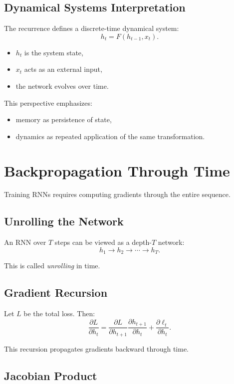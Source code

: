 \subsection{Dynamical Systems Interpretation}

The recurrence defines a discrete-time dynamical system:
\[
h_t = F(h_{t-1}, x_t).
\]

\begin{itemize}
    \item $h_t$ is the system state,
    \item $x_t$ acts as an external input,
    \item the network evolves over time.
\end{itemize}

This perspective emphasizes:
\begin{itemize}
    \item memory as persistence of state,
    \item dynamics as repeated application of the same transformation.
\end{itemize}

\section{Backpropagation Through Time}

Training RNNs requires computing gradients through the entire sequence.

\subsection{Unrolling the Network}

An RNN over $T$ steps can be viewed as a depth-$T$ network:
\[
h_1 \to h_2 \to \cdots \to h_T.
\]

This is called \emph{unrolling} in time.

\subsection{Gradient Recursion}

Let $L$ be the total loss. Then:
\[
\frac{\partial L}{\partial h_t}
=
\frac{\partial L}{\partial h_{t+1}} \frac{\partial h_{t+1}}{\partial h_t}
+ \frac{\partial \ell_t}{\partial h_t}.
\]

This recursion propagates gradients backward through time.

\subsection{Jacobian Product}

